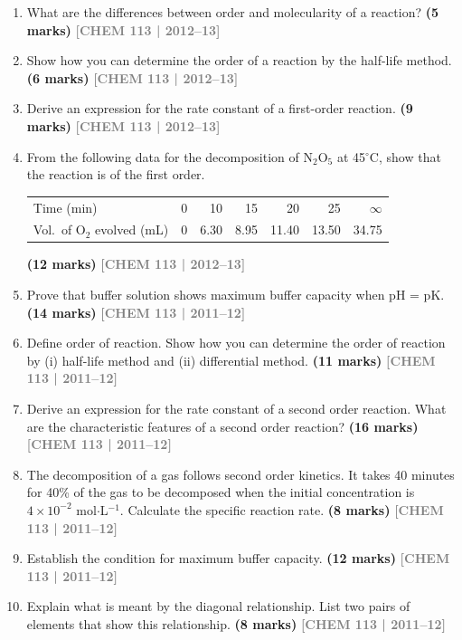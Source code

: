 \documentclass[12pt,a3paper]{article}
\newcommand{\yr}[1]{\hfill\textcolor{gray}{\small\textbf{[#1]}}}
\newcommand{\mk}[1]{\textcolor{orange!70!black}{\small\textbf{(#1 marks)}}}
\begin{document}
\begin{enumerate}
\item What are the differences between order and molecularity of a reaction? \mk{5}
\yr{CHEM 113 | 2012--13}

\item Show how you can determine the order of a reaction by the half-life method. \mk{6}
\yr{CHEM 113 | 2012--13}

\item Derive an expression for the rate constant of a first-order reaction. \mk{9}
\yr{CHEM 113 | 2012--13}

\item From the following data for the decomposition of N$_2$O$_5$ at 45$^\circ$C, show that the reaction is of the first order.
\begin{center}
\begin{tabular}{lrrrrrr}
\toprule
Time (min) & 0 & 10 & 15 & 20 & 25 & $\infty$ \\
Vol.\ of O$_2$ evolved (mL) & 0 & 6.30 & 8.95 & 11.40 & 13.50 & 34.75 \\
\bottomrule
\end{tabular}
\end{center}
\mk{12}
\yr{CHEM 113 | 2012--13}

\item Prove that buffer solution shows maximum buffer capacity when pH = pK. \mk{14}
\yr{CHEM 113 | 2011--12}

\item Define order of reaction. Show how you can determine the order of reaction by (i) half-life method and (ii) differential method. \mk{11}
\yr{CHEM 113 | 2011--12}

\item Derive an expression for the rate constant of a second order reaction. What are the characteristic features of a second order reaction? \mk{16}
\yr{CHEM 113 | 2011--12}

\item The decomposition of a gas follows second order kinetics. It takes 40 minutes for 40\% of the gas to be decomposed when the initial concentration is $4 \times 10^{-2}$ mol$\cdot$L$^{-1}$. Calculate the specific reaction rate. \mk{8}
\yr{CHEM 113 | 2011--12}

\item Establish the condition for maximum buffer capacity. \mk{12}
\yr{CHEM 113 | 2011--12}

\item Explain what is meant by the diagonal relationship. List two pairs of elements that show this relationship. \mk{8}
\yr{CHEM 113 | 2011--12}


\end{enumerate}
\end{document}
